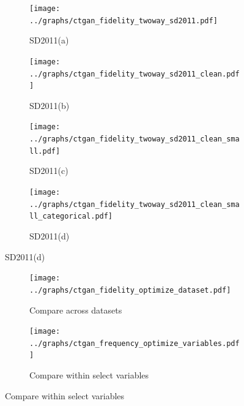 \begin{figure}
  \caption{CTGAN two-way correlation (SPECKS)}
  \label{fig:ctgan_fidelity_two_way}
  \centering

  \begin{subfigure}{0.45\textwidth}
    \texttt{[image: ../graphs/ctgan\_fidelity\_twoway\_sd2011.pdf]}
    \caption{SD2011(a)}
    \label{fig:ctgan_fidelity_two_way_subfig-a}
  \end{subfigure}
  \hfill
  \begin{subfigure}{0.45\textwidth}
    \texttt{[image: ../graphs/ctgan\_fidelity\_twoway\_sd2011\_clean.pdf]}
    \caption{SD2011(b)}
    \label{fig:ctgan_fidelity_two_way_subfig-b}
  \end{subfigure}

  \vspace{1em}

  \begin{subfigure}{0.45\textwidth}
    \texttt{[image: ../graphs/ctgan\_fidelity\_twoway\_sd2011\_clean\_small.pdf]}
    \caption{SD2011(c)}
    \label{fig:ctgan_fidelity_two_way_subfig-c}
  \end{subfigure}
  \hfill
  \begin{subfigure}{0.45\textwidth}
    \texttt{[image: ../graphs/ctgan\_fidelity\_twoway\_sd2011\_clean\_small\_categorical.pdf]}
    \caption{SD2011(d)}
    \label{fig:ctgan_fidelity_two_way_subfig-d}
  \end{subfigure}
\end{figure}

\begin{figure}[ht]
  \caption{Tuning CTGAN}
  \label{fig:tuning_ctgan}
  \centering

  \begin{subfigure}{.75\textwidth}
    \texttt{[image: ../graphs/ctgan\_fidelity\_optimize\_dataset.pdf]}
    \caption{Compare across datasets}
    \label{subfig:tuning_ctgan_dataset}
  \end{subfigure}


  \begin{subfigure}{.75\textwidth}
    \texttt{[image: ../graphs/ctgan\_frequency\_optimize\_variables.pdf]}
    \caption{Compare within select variables}
    \label{subfig:tuning_ctgan_variables_within}
  \end{subfigure}
\end{figure}


